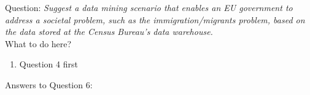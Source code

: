 Question:
\emph{
    Suggest a data mining scenario that enables an EU government to address a societal
problem, such as the immigration/migrants problem, based on the data stored at the
Census Bureau’s data warehouse.
}\\

What to do here?
\begin{enumerate}
    \item Question 4 first
  \end{enumerate}

\newpage Answers to Question 6:

